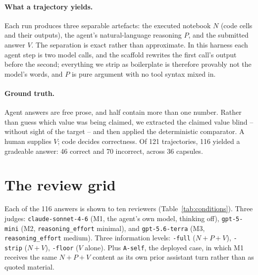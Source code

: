 \documentclass{article}
\begin{document}
\paragraph{What a trajectory yields.} Each run produces three separable artefacts: the
executed notebook $N$ (code cells and their outputs), the agent's natural-language
reasoning $P$, and the submitted answer $V$. The separation is exact rather than
approximate. In this harness each agent step is two model calls, and the scaffold rewrites
the first call's output before the second; everything we strip as boilerplate is therefore
provably not the model's words, and $P$ is pure argument with no tool syntax mixed in.

\paragraph{Ground truth.} Agent answers are free prose, and half contain more than one
number. Rather than guess which value was being claimed, we extracted the claimed value
blind -- without sight of the target -- and then applied the deterministic comparator.
A human supplies $V$; code decides correctness. Of 121 trajectories, 116 yielded a
gradeable answer: 46 correct and 70 incorrect, across 36 capsules.

\section{The review grid}
\label{sec:design}

Each of the 116 answers is shown to ten reviewers (Table~\ref{tab:conditions}). Three
judges: \texttt{claude-sonnet-4-6} (M1, the agent's own model, thinking off),
\texttt{gpt-5-mini} (M2, \texttt{reasoning\_effort} minimal), and \texttt{gpt-5.6-terra}
(M3, \texttt{reasoning\_effort} medium). Three information levels: \texttt{-full}
($N{+}P{+}V$), \texttt{-strip} ($N{+}V$), \texttt{-floor} ($V$ alone). Plus
\texttt{A-self}, the deployed case, in which M1 receives the same $N{+}P{+}V$ content as
its own prior assistant turn rather than as quoted material.
\end{document}
